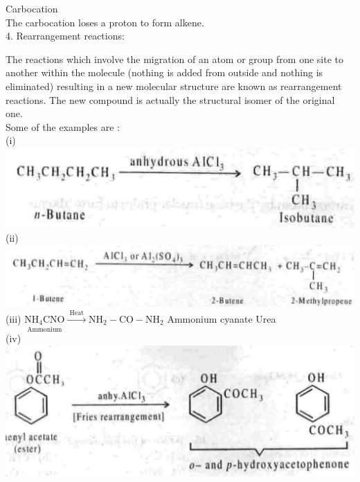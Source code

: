 \documentclass[10pt]{article}
\begin{document}
Carbocation\\
The carbocation loses a proton to form alkene.\\
4. Rearrangement reactions:

The reactions which involve the migration of an atom or group from one site to another within the molecule (nothing is added from outside and nothing is eliminated) resulting in a new molecular structure are known as rearrangement reactions. The new compound is actually the structural isomer of the original one.\\
Some of the examples are :\\
(i)\\
\includegraphics[max width=\textwidth, center]{2025_01_28_8470952b98110cec3aabg-100(4)}\\
(ii)\\
\includegraphics[max width=\textwidth, center]{2025_01_28_8470952b98110cec3aabg-100(6)}\\
(iii) $\underset{\text { Ammonium }}{\mathrm{NH}_{4} \mathrm{CNO}} \xrightarrow{\text { Heat }} \mathrm{NH}_{2}-\mathrm{CO}-\mathrm{NH}_{2}$ Ammonium cyanate Urea\\
(iv)\\
\includegraphics[max width=\textwidth, center]{2025_01_28_8470952b98110cec3aabg-101}
\end{document}
